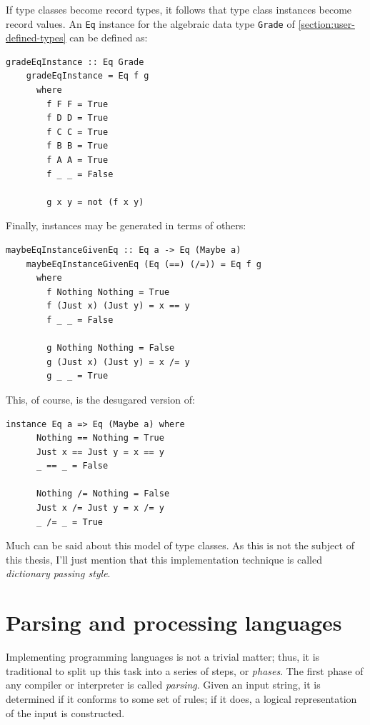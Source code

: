 \documentclass[UdineBachThesis,american,11pt]{PhdThesis}
\begin{document}
  If type classes become record types, it follows that type class instances
  become record values. An \mbox{\texttt{Eq}} instance for the algebraic data
  type \mbox{\texttt{Grade}} of \autoref{section:user-defined-types} can be
  defined as:

  \begin{Verbatim}[gobble=4,fontsize=\small]
    gradeEqInstance :: Eq Grade
    gradeEqInstance = Eq f g
      where
        f F F = True
        f D D = True
        f C C = True
        f B B = True
        f A A = True
        f _ _ = False

        g x y = not (f x y)
  \end{Verbatim}

  Finally, instances may be generated in terms of others:

  \begin{Verbatim}[gobble=4,fontsize=\small]
    maybeEqInstanceGivenEq :: Eq a -> Eq (Maybe a)
    maybeEqInstanceGivenEq (Eq (==) (/=)) = Eq f g
      where
        f Nothing Nothing = True
        f (Just x) (Just y) = x == y
        f _ _ = False

        g Nothing Nothing = False
        g (Just x) (Just y) = x /= y
        g _ _ = True
  \end{Verbatim}

  This, of course, is the desugared version of:

  \begin{Verbatim}[gobble=4,fontsize=\small]
    instance Eq a => Eq (Maybe a) where
      Nothing == Nothing = True
      Just x == Just y = x == y
      _ == _ = False

      Nothing /= Nothing = False
      Just x /= Just y = x /= y
      _ /= _ = True
  \end{Verbatim}

  Much can be said about this model of type classes. As this is not the subject
  of this thesis, I'll just mention that this implementation technique is called
  \emph{dictionary passing style}.

  \chapter{Parsing and processing languages}

  Implementing programming languages is not a trivial matter; thus, it is
  traditional to split up this task into a series of steps, or \emph{phases}.
  The first phase of any compiler or interpreter is called \emph{parsing}. Given
  an input string, it is determined if it conforms to some set of rules; if it
  does, a logical representation of the input is constructed.
\end{document}
